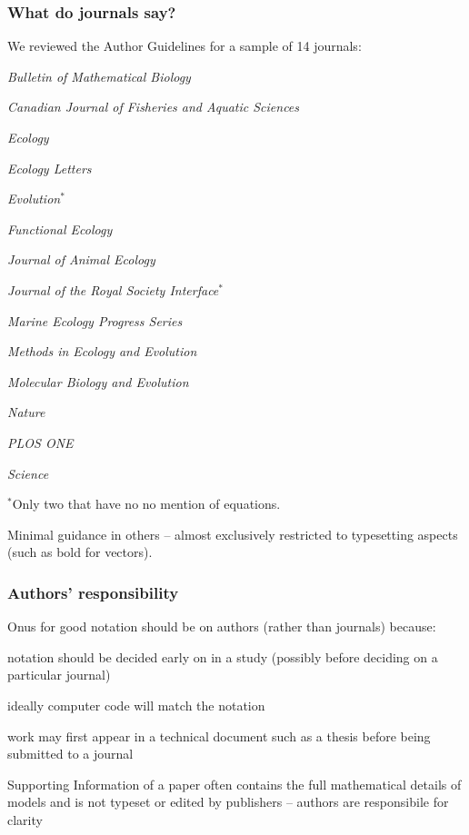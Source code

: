 \begin{frame}
\frametitle{What do journals say?}
We reviewed the Author Guidelines for a sample of 14 journals:
\begin{multicols}{2}
\bi
\item \emph{Bulletin of Mathematical Biology}
\item \emph{Canadian Journal of Fisheries and Aquatic Sciences}
\item \emph{Ecology}
\item \emph{Ecology Letters}
\item \emph{Evolution$^*$}
\item \emph{Functional Ecology}
\item \emph{Journal of Animal Ecology}
\item \emph{Journal of the Royal Society Interface$^*$}
\item \emph{Marine Ecology Progress Series}
\item \emph{Methods in Ecology and Evolution}
\item \emph{Molecular Biology and Evolution}
\item \emph{Nature}
\item \emph{PLOS ONE}
\item \emph{Science}
\item[\vspace{\fill}]
\ei
\end{multicols}

$^*$Only two that have no no mention of equations.

Minimal guidance in others -- almost exclusively restricted to typesetting aspects
(such as bold for vectors).

\end{frame}

\begin{frame}
\frametitle{Authors' responsibility}
Onus for good notation should be on authors (rather than journals)
because:
\bi
  \item notation should be decided early on in a study (possibly before deciding on a
    particular journal)
  \item ideally computer code will match the notation
  \item  work may first appear in a technical document such as a thesis before being
      submitted to a journal
  \item Supporting Information of a paper often contains the full mathematical details of
models and is not typeset or edited by publishers -- authors are responsibile for
clarity
\ei
\end{frame}


